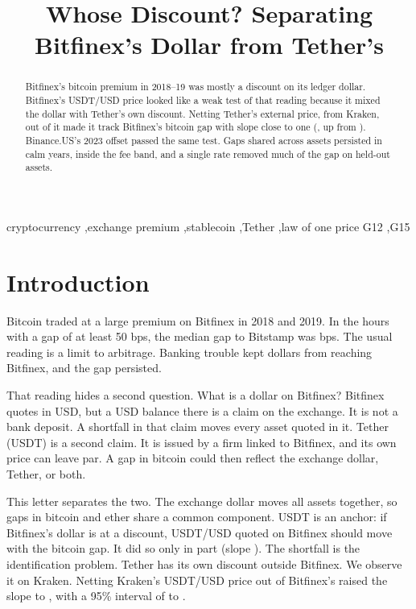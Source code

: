 \documentclass[preprint,10pt]{elsarticle}
\begin{document}
\begin{frontmatter}
\title{Whose Discount? Separating Bitfinex's Dollar from Tether's}

\begin{abstract}
Bitfinex's bitcoin premium in 2018--19 was mostly a discount on its ledger dollar. Bitfinex's USDT/USD price looked like a weak test of that reading because it mixed the dollar with Tether's own discount. Netting Tether's external price, from Kraken, out of it made it track Bitfinex's bitcoin gap with slope close to one (\NumKStressDaySlopeAdj{}, up from \NumKStressDaySlopeD{}). Binance.US's 2023 offset passed the same test. Gaps shared across assets persisted in calm years, inside the fee band, and a single rate removed much of the gap on held-out assets.
\end{abstract}

\begin{keyword}
cryptocurrency \sep exchange premium \sep stablecoin \sep Tether \sep law of one price
\JEL G12 \sep G15
\end{keyword}
\end{frontmatter}

\section{Introduction}
Bitcoin traded at a large premium on Bitfinex in 2018 and 2019. In the hours with a gap of at least 50 bps, the median gap to Bitstamp was \NumKStressMedL{} bps. The usual reading is a limit to arbitrage. Banking trouble kept dollars from reaching Bitfinex, and the gap persisted.

That reading hides a second question. What is a dollar on Bitfinex? Bitfinex quotes in USD, but a USD balance there is a claim on the exchange. It is not a bank deposit. A shortfall in that claim moves every asset quoted in it. Tether (USDT) is a second claim. It is issued by a firm linked to Bitfinex, and its own price can leave par. A gap in bitcoin could then reflect the exchange dollar, Tether, or both.

This letter separates the two. The exchange dollar moves all assets together, so gaps in bitcoin and ether share a common component. USDT is an anchor: if Bitfinex's dollar is at a discount, USDT/USD quoted on Bitfinex should move with the bitcoin gap. It did so only in part (slope \NumKStressDaySlopeD{}). The shortfall is the identification problem. Tether has its own discount outside Bitfinex. We observe it on Kraken. Netting Kraken's USDT/USD price out of Bitfinex's raised the slope to \NumKStressDaySlopeAdj{}, with a 95\% interval of \NumKStressDaySlopeAdjMoLo{} to \NumKStressDaySlopeAdjMoHi{}.
\end{document}
